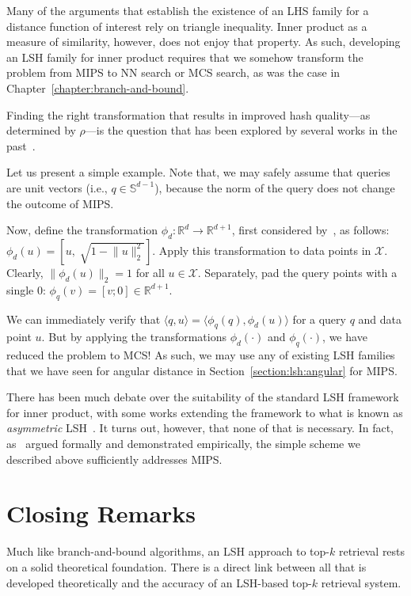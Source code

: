 Many of the arguments that establish the existence of an LHS family for a distance function
of interest rely on triangle inequality. Inner product as a measure of similarity, however,
does not enjoy that property. As such, developing an LSH family for inner product requires
that we somehow transform the problem from MIPS to NN search or MCS search,
as was the case in Chapter~\ref{chapter:branch-and-bound}.

Finding the right transformation that results in improved hash quality---as determined by
$\rho$---is the question that has been explored by several works in the
past~\citep{Neyshabur2015lsh-mips,shrivastava2015alsh,shrivastava2014alsh,yan2018norm-ranging-lsh}.

Let us present a simple example. Note that, we may safely assume that queries are unit
vectors (i.e., $q \in \mathbb{S}^{d-1}$), because the norm of the query does not
change the outcome of MIPS. 

Now, define the transformation $\phi_d: \mathbb{R}^d \rightarrow \mathbb{R}^{d + 1}$,
first considered by~\cite{xbox-tree}, as follows: $\phi_d(u) = [u, \; \sqrt{1 - \lVert u \rVert_2^2}]$.
Apply this transformation to data points in $\mathcal{X}$.
Clearly, $\lVert \phi_d(u) \rVert_2 = 1$ for all $u \in \mathcal{X}$.
Separately, pad the query points with a single $0$: $\phi_q(v) = [v; 0] \in \mathbb{R}^{d+1}$.

We can immediately verify that $\langle q, u \rangle = \langle \phi_q(q), \phi_d(u) \rangle$
for a query $q$ and data point $u$.
But by applying the transformations $\phi_d(\cdot)$ and $\phi_q(\cdot)$,
we have reduced the problem to MCS! As such, we may use any of existing LSH families
that we have seen for angular distance in Section~\ref{section:lsh:angular} for MIPS.

\medskip

There has been much debate over the suitability of the standard LSH framework
for inner product, with some works extending the framework to what is known as \emph{asymmetric}
LSH~\citep{shrivastava2014alsh,shrivastava2015alsh}. It turns out, however, that none of that
is necessary. In fact, as~\cite{Neyshabur2015lsh-mips} argued formally and demonstrated empirically,
the simple scheme we described above sufficiently addresses MIPS.

\section{Closing Remarks}
Much like branch-and-bound algorithms, an LSH approach to top-$k$ retrieval
rests on a solid theoretical foundation. There is a direct link between all that is
developed theoretically and the accuracy of an LSH-based top-$k$ retrieval system.

